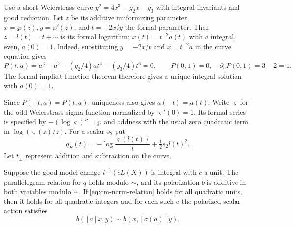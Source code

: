 Use a short Weierstrass curve \(y^2=4x^3-g_2x-g_3\) with
integral invariants and good reduction. Let \(z\) be its
additive uniformizing parameter, \(x=\wp(z),y=\wp'(z)\),
and \(t=-2x/y\) the formal parameter. Then \(z=l(t)=t+\cdots\)
is its formal logarithm; \(x(t)=t^{-2}a(t)\) with \(a\)
integral, even, \(a(0)=1\). Indeed, substituting \(y=-2x/t\) and \(x=t^{-2}a\) in the curve
equation gives
\[
 P(t,a)=a^3-a^2-(g_2/4)at^4-(g_3/4)t^6=0,\qquad
 P(0,1)=0,\quad \partial_aP(0,1)=3-2=1 .
\]
The formal implicit-function theorem therefore gives a unique integral
solution with \(a(0)=1\).

Since \(P(-t,a)=P(t,a)\), uniqueness also
gives \(a(-t)=a(t)\). Write \(\varsigma\) for
the odd Weierstrass sigma function normalized by
\(\varsigma'(0)=1\). Its formal series is specified by
\(-(\log\varsigma)''=\wp\) and oddness with the usual
zero quadratic term in \(\log(\varsigma(z)/z)\).
For a scalar \(s_2\) put
\[
       q_E(t)=-\log\frac{\varsigma(l(t))}{t}
                                     +\tfrac12s_2 l(t)^2.
\]
Let \(t_\pm\) represent addition and subtraction on the curve.
\begin{proposition}\label{prop:curve-additive-pairing}
Suppose the good-model change \(l^{-1}(cL(X))\) is integral
with \(c\) a unit. The parallelogram relation for \(q\) holds
modulo \(\sim\), and its polarization \(b\) is additive in both
variables modulo \(\sim\). If \eqref{eq:cm-norm-relation} holds
for all quadratic units, then it holds for all quadratic integers
and for each such \(a\) the polarized scalar action satisfies
\[
 b([a]x,y)\sim b(x,[\sigma(a)]y).
\]

\end{proposition}

